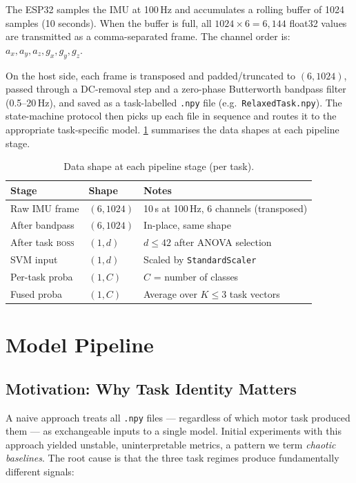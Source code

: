 \documentclass[12pt, a4paper]{article}
\newcommand{\boss}{\textsc{boss}}
\begin{document}
The ESP32 samples the IMU at 100\,Hz and accumulates a rolling buffer
of 1024 samples (10 seconds). When the buffer is full, all
$1024 \times 6 = 6{,}144$ float32 values are transmitted as a
comma-separated frame. The channel order is:
$a_x, a_y, a_z, g_x, g_y, g_z$.

On the host side, each frame is transposed and padded/truncated to $(6, 1024)$,
passed through a DC-removal step and a zero-phase Butterworth bandpass filter
(0.5--20\,Hz), and saved as a task-labelled \texttt{.npy} file
(e.g.\ \texttt{RelaxedTask.npy}). The state-machine protocol
then picks up each file in sequence and routes it to the appropriate
task-specific model. \cref{tab:shapes} summarises the data shapes at
each pipeline stage.

\begin{table}[htbp]
  \centering
  \caption{Data shape at each pipeline stage (per task).}
  \label{tab:shapes}
  \begin{tabular}{lll}
    \toprule
    Stage & Shape & Notes \\
    \midrule
    Raw IMU frame & $(6, 1024)$ & 10\,s at 100\,Hz, 6 channels (transposed) \\
    After bandpass & $(6, 1024)$ & In-place, same shape \\
    After task \boss{} & $(1, d)$ & $d \leq 42$ after ANOVA selection \\
    SVM input & $(1, d)$ & Scaled by \texttt{StandardScaler} \\
    Per-task proba & $(1, C)$ & $C$ = number of classes \\
    Fused proba & $(1, C)$ & Average over $K \leq 3$ task vectors \\
    \bottomrule
  \end{tabular}
\end{table}

\section{Model Pipeline}
\label{sec:pipeline}

\subsection{Motivation: Why Task Identity Matters}

A naive approach treats all \texttt{.npy} files — regardless of which
motor task produced them — as exchangeable inputs to a single model.
Initial experiments with this approach yielded unstable, uninterpretable
metrics, a pattern we term \emph{chaotic baselines}. The root cause is
that the three task regimes produce fundamentally different signals:
\end{document}
